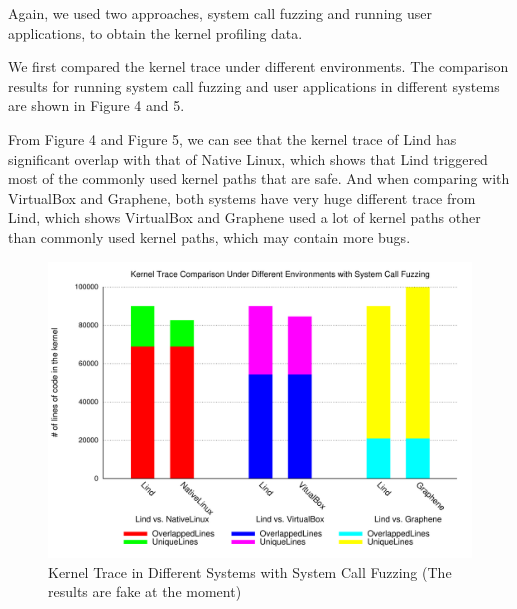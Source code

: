 Again, we used two approaches, system call fuzzing and running user applications, to obtain the
kernel profiling data. 

We first compared the kernel trace under different environments.
The comparison results for running system call fuzzing and user applications in different systems 
are shown in Figure 4 and 5.

From Figure 4 and Figure 5, we can see that the kernel trace of Lind has significant overlap with that of Native Linux, 
which shows that Lind triggered most of the commonly used kernel paths that are safe. And when comparing 
with VirtualBox and Graphene, both systems have very huge different trace from Lind, which shows VirtualBox and Graphene
used a lot of kernel paths other than commonly used kernel paths, which may contain more bugs.  

\begin{figure}[h]
\centering
\includegraphics[width=1.0\columnwidth]{diagram/lind_ccs15_diagram_03.pdf}
\caption{Kernel Trace in Different Systems with System Call Fuzzing {\color{red}(The results are fake at the moment)} }
\label{fig:different_systems_systemcallfuzzing_trace}
\end{figure}


